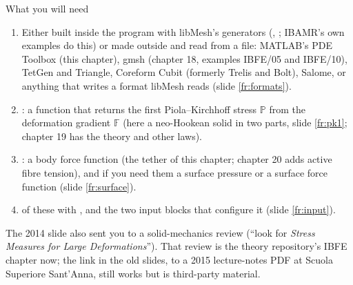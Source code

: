 \documentclass[aspectratio=169,11pt]{beamer}
\begin{document}
\begin{frame}{What you will need}
\label{fr:need}
\footnotesize
\begin{enumerate}
  \item {} Either built inside the program with libMesh's generators (, ; IBAMR's own examples do this) or made outside and read from a file: MATLAB's PDE Toolbox (this chapter), gmsh (chapter 18, examples IBFE/05 and IBFE/10), TetGen and Triangle, Coreform Cubit (formerly Trelis and Bolt), Salome, or anything that writes a format libMesh reads (slide \ref{fr:formats}).
  \item {}: a function that returns the first Piola--Kirchhoff stress $\mathbb{P}$ from the deformation gradient $\mathbb{F}$ (here a neo-Hookean solid in two parts, slide \ref{fr:pk1}; chapter 19 has the theory and other laws).
  \item {}: a body force function (the tether of this chapter; chapter 20 adds active fibre tension), and if you need them a surface pressure or a surface force function (slide \ref{fr:surface}).
  \item {} of these with , and the two input blocks that configure it (slide \ref{fr:input}).
\end{enumerate}
\begin{punchbox}
\footnotesize The 2014 slide also sent you to a solid-mechanics review (``look for \emph{Stress Measures for Large Deformations}''). That review is the theory repository's IBFE chapter now; the link in the old slides, to a 2015 lecture-notes PDF at Scuola Superiore Sant'Anna, still works but is third-party material.
\end{punchbox}
\end{frame}
\end{document}

